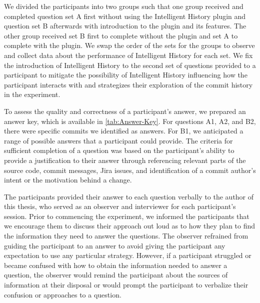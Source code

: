 We divided the participants into two groups such that one group received 
and completed question set A first without using the Intelligent History plugin 
and question set B afterwards with introduction to the plugin and its features.
The other group received set B first to complete without the plugin
and set A to complete with the plugin.
We swap the order of the sets for the groups 
to observe and collect data about the performance of Intelligent History for each set.
We fix the introduction of Intelligent History to the second set of questions
provided to a participant to mitigate the possibility of Intelligent History influencing
how the participant interacts with and strategizes their exploration of the commit history in the experiment.

To assess the quality and correctness of a participant's answer, 
we prepared an answer key, which is available in \autoref{tab:Answer-Key}.
For questions A1, A2, and B2, there were specific commits we identified as answers.
For B1, we anticipated a range of possible answers that a participant could provide.
The criteria for sufficient completion of a question was based on the participant's ability 
to provide a justification to their answer through referencing relevant parts of the source code, commit messages, Jira issues, and
identification of a commit author's intent or the motivation behind a change.

The participants provided their answer to each question verbally to the author of this thesis, 
who served as an observer and interviewer for each participant's session.
Prior to commencing the experiment, we informed the participants that we encourage them to discuss their approach 
out loud as to how they plan to find the information they need to answer the questions.
The observer refrained from guiding the participant to an answer to avoid 
giving the participant any expectation to use any particular strategy.
However, if a participant struggled or became confused with how to obtain the 
information needed to answer a question, the observer would remind the participant about 
the sources of information at their disposal or would prompt the participant to verbalize
their confusion or approaches to a question.

